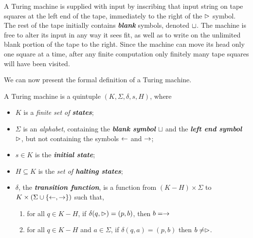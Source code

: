 A Turing machine is supplied with input by inscribing that input string on tape squares at the left end of the tape, immediately to the right of the $\vartriangleright$ symbol. The rest of the tape initially contains \textit{\textbf{blank}} symbols, denoted $\sqcup$. The machine is free to alter its input in any way it sees fit, as well as to write on the unlimited blank portion of the tape to the right. Since the machine can move its head only one square at a time, after any finite computation only finitely many tape squares will have been visited.

We can now present the formal definition of a Turing machine.
\begin{definition}{}
A Turing machine is a quintuple $(K, \Sigma, \delta, s, H)$, where
\begin{itemize}
  \item $K$ is a \textit{finite set of \textbf{states}};
  \item $\Sigma$ is an \textit{alphabet}, containing the \textit{\textbf{blank symbol}} $\sqcup$ and the \textit{\textbf{left end symbol}} $\vartriangleright$, but not containing the symbols $\leftarrow$ and $\rightarrow$;
  \item $s \in K$ is the \textbf{\textit{initial state}};
  \item $H \subseteq K$ is the \textit{set of \textbf{halting states}};
  \item $\delta$, the \textbf{\textit{transition function}}, is a function from $(K - H) \times \Sigma$ to $K \times (\Sigma \cup \{ \leftarrow, \rightarrow \})$ such that,
    \begin{enumerate}[label=(\alph*)]
      \item for all $q \in K - H$, if $\delta(q, \vartriangleright) = (p, b)$, then $b = \rightarrow$
      \item for all $q \in K - H$ and $a \in \Sigma$, if $\delta(q, a) = (p, b)$ then $b \neq \vartriangleright$. 
    \end{enumerate}
\end{itemize}
\end{definition}

